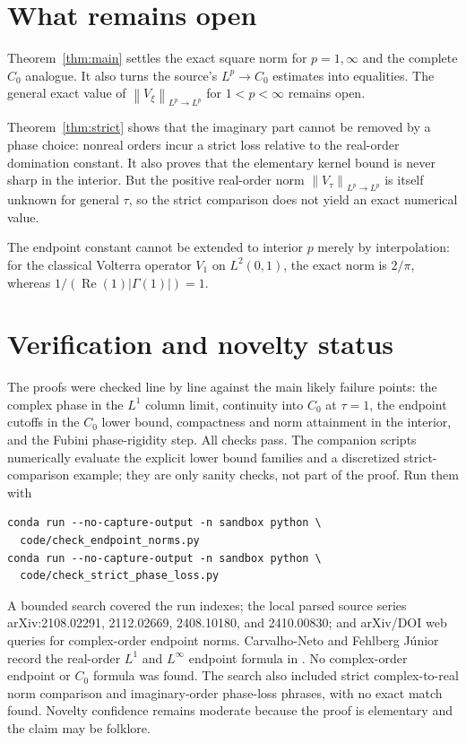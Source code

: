 \documentclass[11pt]{article}
\newcommand{\1}{\mathbf 1}
\newcommand{\norm}[1]{\left\lVert #1\right\rVert}
\begin{document}
\section{What remains open}

Theorem~\ref{thm:main} settles the exact square norm for \(p=1,\infty\) and
the complete \(C_0\) analogue.  It also turns the source's
\(L^p\to C_0\) estimates into equalities.  The general exact value of
\(\norm{V_\xi}_{L^p\to L^p}\) for \(1<p<\infty\) remains open.

Theorem~\ref{thm:strict} shows that the imaginary part cannot be removed by a
phase choice: nonreal orders incur a strict loss relative to the real-order
domination constant.  It also proves that the elementary kernel bound is
never sharp in the interior.  But the positive real-order norm
\(\norm{V_\tau}_{L^p\to L^p}\) is itself unknown for general \(\tau\), so the
strict comparison does not yield an exact numerical value.

The endpoint constant cannot be extended to interior \(p\) merely by
interpolation: for the classical Volterra operator \(V_1\) on \(L^2(0,1)\),
the exact norm is \(2/\pi\), whereas
\(1/(\operatorname{Re}(1)|\Gamma(1)|)=1\).

\section{Verification and novelty status}

The proofs were checked line by line against the main likely failure points:
the complex phase in the \(L^1\) column limit, continuity into \(C_0\) at
\(\tau=1\), the endpoint cutoffs in the \(C_0\) lower bound, compactness and
norm attainment in the interior, and the Fubini phase-rigidity step.  All
checks pass.  The companion scripts numerically evaluate the explicit lower
bound families and a discretized strict-comparison example; they are only
sanity checks, not part of the proof.  Run them with
\begin{verbatim}
conda run --no-capture-output -n sandbox python \
  code/check_endpoint_norms.py
conda run --no-capture-output -n sandbox python \
  code/check_strict_phase_loss.py
\end{verbatim}

A bounded search covered the run indexes; the local parsed source series
arXiv:2108.02291, 2112.02669, 2408.10180, and 2410.00830; and arXiv/DOI web
queries for complex-order endpoint norms.  Carvalho-Neto and Fehlberg J\'unior
record the real-order \(L^1\) and \(L^\infty\) endpoint formula in
\cite{bochner}.  No complex-order endpoint or \(C_0\) formula was found.
The search also included strict complex-to-real norm comparison and
imaginary-order phase-loss phrases, with no exact match found.
Novelty confidence remains moderate because the proof is elementary and the
claim may be folklore.
\end{document}
